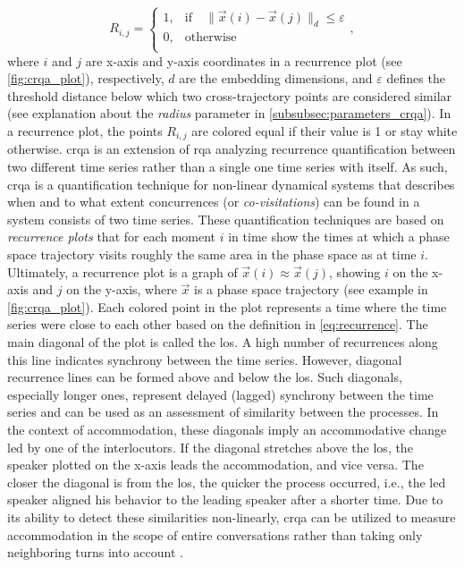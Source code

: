 \begin{equation}
	\label{eq:recurrence}
	R_{i,j} =
	\begin{cases}
		1,	&	\text{if} \quad \lVert \vec{x}(i)-\vec{x}(j) \rVert_d \leq \varepsilon \\
		0,	&	\text{otherwise} \\
	\end{cases},
\end{equation}
%
where $i$ and $j$ are x-axis and y-axis coordinates in a recurrence plot (see \cref{fig:crqa_plot}), respectively, $d$ are the embedding dimensions, and $\varepsilon$ defines the threshold distance below which two cross-trajectory points are considered similar (see explanation about the \emph{radius} parameter in \cref{subsubsec:parameters_crqa}).
In a recurrence plot, the points $R_{i,j}$ are colored equal if their value is 1 or stay white otherwise.
\Ac{crqa} is an extension of \ac{rqa} analyzing recurrence quantification between two different time series rather than a single one time series with itself.
As such, \ac{crqa} is a quantification technique for non-linear dynamical systems that describes when and to what extent concurrences (or \emph{co-visitations}) can be found in a system consists of two time series.
These quantification techniques are based on \emph{recurrence plots} that for each moment $i$ in time show the times at which a phase space trajectory visits roughly the same area in the phase space as at time $i$.
Ultimately, a recurrence plot is a graph of $\vec{x}(i) \approx \vec{x}(j)$, showing $i$ on the x-axis and $j$ on the y-axis, where $\vec{x}$ is a phase space trajectory (see example in \cref{fig:crqa_plot}).
Each colored point in the plot represents a time where the time series were close to each other based on the definition in \cref{eq:recurrence}.
The main diagonal of the plot is called the \acf{los}.
A high number of recurrences along this line indicates synchrony between the time series.
However, diagonal recurrence lines can be formed above and below the \ac{los}.
Such diagonals, especially longer ones, represent delayed (lagged) synchrony between the time series and can be used as an assessment of similarity between the processes.
In the context of accommodation, these diagonals imply an accommodative change led by one of the interlocutors.
If the diagonal stretches above the \ac{los}, the speaker plotted on the x-axis leads the accommodation, and vice versa.
The closer the diagonal is from the \ac{los}, the quicker the process occurred, i.e., the led speaker aligned his behavior to the leading speaker after a shorter time.
Due to its ability to detect these similarities non-linearly, \ac{crqa} can be utilized to measure accommodation in the scope of entire conversations rather than taking only neighboring turns into account \citep[cf.][]{Levitan2013entrainment}.

